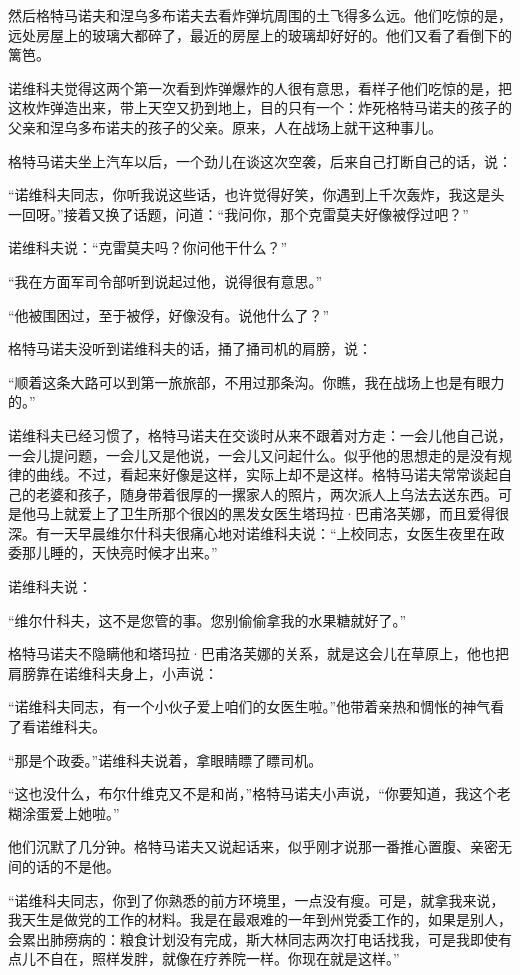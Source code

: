 然后格特马诺夫和涅乌多布诺夫去看炸弹坑周围的土飞得多么远。他们吃惊的是，远处房屋上的玻璃大都碎了，最近的房屋上的玻璃却好好的。他们又看了看倒下的篱笆。

诺维科夫觉得这两个第一次看到炸弹爆炸的人很有意思，看样子他们吃惊的是，把这枚炸弹造出来，带上天空又扔到地上，目的只有一个：炸死格特马诺夫的孩子的父亲和涅乌多布诺夫的孩子的父亲。原来，人在战场上就干这种事儿。

格特马诺夫坐上汽车以后，一个劲儿在谈这次空袭，后来自己打断自己的话，说：

“诺维科夫同志，你听我说这些话，也许觉得好笑，你遇到上千次轰炸，我这是头一回呀。”接着又换了话题，问道：“我问你，那个克雷莫夫好像被俘过吧？”

诺维科夫说：“克雷莫夫吗？你问他干什么？”

“我在方面军司令部听到说起过他，说得很有意思。”

“他被围困过，至于被俘，好像没有。说他什么了？”

格特马诺夫没听到诺维科夫的话，捅了捅司机的肩膀，说：

“顺着这条大路可以到第一旅旅部，不用过那条沟。你瞧，我在战场上也是有眼力的。”

诺维科夫已经习惯了，格特马诺夫在交谈时从来不跟着对方走：一会儿他自己说，一会儿提问题，一会儿又是他说，一会儿又问起什么。似乎他的思想走的是没有规律的曲线。不过，看起来好像是这样，实际上却不是这样。格特马诺夫常常谈起自己的老婆和孩子，随身带着很厚的一摞家人的照片，两次派人上乌法去送东西。可是他马上就爱上了卫生所那个很凶的黑发女医生塔玛拉·巴甫洛芙娜，而且爱得很深。有一天早晨维尔什科夫很痛心地对诺维科夫说：“上校同志，女医生夜里在政委那儿睡的，天快亮时候才出来。”

诺维科夫说：

“维尔什科夫，这不是您管的事。您别偷偷拿我的水果糖就好了。”

格特马诺夫不隐瞒他和塔玛拉·巴甫洛芙娜的关系，就是这会儿在草原上，他也把肩膀靠在诺维科夫身上，小声说：

“诺维科夫同志，有一个小伙子爱上咱们的女医生啦。”他带着亲热和惆怅的神气看了看诺维科夫。

“那是个政委。”诺维科夫说着，拿眼睛瞟了瞟司机。

“这也没什么，布尔什维克又不是和尚，”格特马诺夫小声说，“你要知道，我这个老糊涂蛋爱上她啦。”

他们沉默了几分钟。格特马诺夫又说起话来，似乎刚才说那一番推心置腹、亲密无间的话的不是他。

“诺维科夫同志，你到了你熟悉的前方环境里，一点没有瘦。可是，就拿我来说，我天生是做党的工作的材料。我是在最艰难的一年到州党委工作的，如果是别人，会累出肺痨病的：粮食计划没有完成，斯大林同志两次打电话找我，可是我即使有点儿不自在，照样发胖，就像在疗养院一样。你现在就是这样。”

